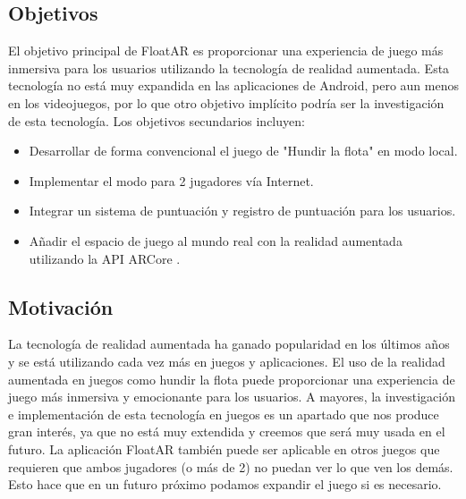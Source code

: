 \documentclass[a4paper, openright, 12pt]{article}
\begin{document}
\subsection{Objetivos}
El objetivo principal de FloatAR es proporcionar una experiencia de juego más inmersiva para los usuarios utilizando la tecnología de realidad aumentada. Esta tecnología no está muy expandida en las aplicaciones de Android, pero aun menos en los videojuegos, por lo que otro objetivo implícito podría ser la investigación de esta tecnología. Los objetivos secundarios incluyen:
\begin{itemize}
    \item Desarrollar de forma convencional el juego de "Hundir la flota" en modo local.
    \item Implementar el modo para 2 jugadores vía Internet.
    \item Integrar un sistema de puntuación y registro de puntuación para los usuarios.
    \item Añadir el espacio de juego al mundo real con la realidad aumentada utilizando la API ARCore \cite{ARCore}.
\end{itemize}
\subsection{Motivación}
La tecnología de realidad aumentada ha ganado popularidad en los últimos años y se está utilizando cada vez más en juegos y aplicaciones. El uso de la realidad aumentada en juegos como hundir la flota puede proporcionar una experiencia de juego más inmersiva y emocionante para los usuarios. A mayores, la investigación e implementación de esta tecnología en juegos es un apartado que nos produce gran interés, ya que no está muy extendida y creemos que será muy usada en el futuro. La aplicación FloatAR también puede ser aplicable en otros juegos que requieren que ambos jugadores (o más de 2) no puedan ver lo que ven los demás. Esto hace que en un futuro próximo podamos expandir el juego si es necesario.

\end{document}
